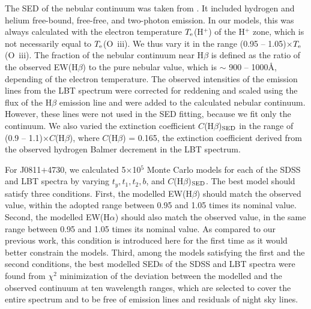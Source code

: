 \documentclass[useAMS,usenatbib]{mn2e}
\begin{document}
The SED of the nebular continuum was taken from \citet{A84}. It
included hydrogen and helium free-bound, free-free, and two-photon emission. 
In our models, this was always calculated with
the electron temperature $T_{\rm e}$(H$^+$) of the H$^+$ zone, which is not 
necessarily equal to $T_{\rm e}$(O~{\sc iii}). We thus vary it in the range
(0.95 -- 1.05)$\times$$T_{\rm e}$(O~{\sc iii}). The fraction of the nebular
continuum near H$\beta$ is defined as the ratio of the observed EW(H$\beta$)
to the pure nebular value, which is $\sim$ 900 -- 1000\AA, depending of the
electron temperature. The observed intensities
of the emission lines from the LBT spectrum were corrected for reddening and 
scaled using the flux of the H$\beta$ 
emission line and were added to the calculated nebular continuum. 
However, these lines were not used in the SED fitting, because we fit only the 
continuum. 
We also varied the extinction coefficient 
$C$(H$\beta$)$_{\rm SED}$ in the range of 
(0.9 -- 1.1)$\times$$C$(H$\beta$), where $C$(H$\beta$) = 0.165, the extinction 
coefficient derived from the observed hydrogen Balmer decrement in the LBT
spectrum.
  
For J0811$+$4730, we calculated 5$\times$10$^5$ Monte Carlo models 
for each of the SDSS and LBT spectra by 
varying $t_y, t_1, t_2, b$, and $C$(H$\beta$)$_{\rm SED}$. The best model should 
satisfy three conditions. First, the modelled EW(H$\beta$) should match 
the observed value, within the adopted range between 0.95
and 1.05 times its nominal value. Second, the modelled EW(H$\alpha$) 
should also match the observed value, in the same range between 0.95
and 1.05 times its nominal value. As compared to our previous work, this condition is introduced here 
for the first time as it would better constrain the models.
Third, among the models satisfying 
the first and the second conditions, the best 
modelled SEDs of the SDSS and LBT spectra were found 
from $\chi^2$ minimization of the deviation between the 
modelled and the observed continuum at ten wavelength ranges, which are 
selected to cover the entire spectrum and to be free 
of emission lines and residuals of night sky lines.
\end{document}

